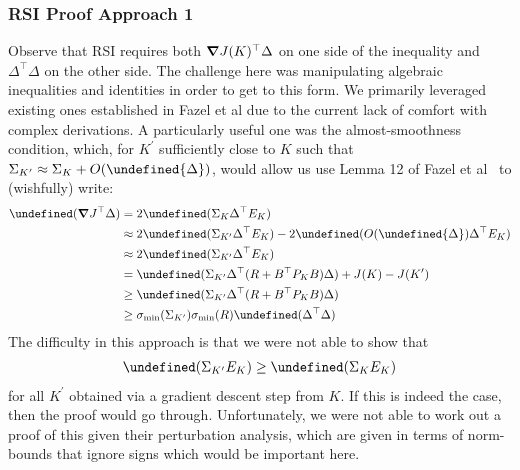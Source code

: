 \documentclass[11pt]{article}  %
\let\norm\undefined
\newcommand{\norm}[1]{\lVert #1 \rVert}
\let\Tr\undefined
\DeclareMathOperator{\Tr}{Tr}
\begin{document}
\subsubsection{RSI Proof Approach 1}
Observe that RSI requires both \(\grad J(K)^\top \Delta\)
on one side of the inequality and \(\Delta^\top \Delta\)
on the other side.
The challenge here was manipulating algebraic inequalities
and identities in order to get to this form.
We primarily leveraged existing ones established in Fazel et al
due to the current lack of comfort with complex derivations.
A particularly useful one was the almost-smoothness condition,
which, for \(K^\prime\) sufficiently close to \(K\)
such that \(\Sigma_{K^\prime} \approx \Sigma_K + O(\norm{\Delta})\),
would allow us use
Lemma 12 of Fazel et al~\cite{fazel2018global} to (wishfully) write:
\begin{align}
  \Tr (\grad J^\top \Delta)
    &= 2 \Tr(\Sigma_K \Delta^\top E_K) \\
    &\approx 2 \Tr(\Sigma_{K^\prime} \Delta^\top E_K)
        - 2 \Tr(O(\norm{\Delta}) \Delta^\top E_K) \\
    &\approx 2 \Tr(\Sigma_{K^\prime} \Delta^\top E_K) \\
    &= \Tr (\Sigma_{K^\prime} \Delta^\top (R + B^\top P_K B) \Delta)
        + J(K) - J(K^\prime) \\
    &\geq \Tr (\Sigma_{K^\prime} \Delta^\top (R + B^\top P_K B) \Delta) \\
    &\geq \sigma_{\min} (\Sigma_{K^\prime})
          \sigma_{\min} (R)
            \Tr (\Delta^\top \Delta)
\end{align}
The difficulty in this approach is that we were not able to show that
\begin{align}
  \Tr(\Sigma_{K^\prime} E_K) \geq \Tr(\Sigma_K E_K) 
\end{align}
for all \(K^\prime\) obtained via a gradient descent step from \(K\).
If this is indeed the case, then the proof would go through.
Unfortunately, we were not able to work out a proof of this given
their perturbation analysis,
which are given in terms of norm-bounds that ignore
signs which would be important here.
\end{document}

